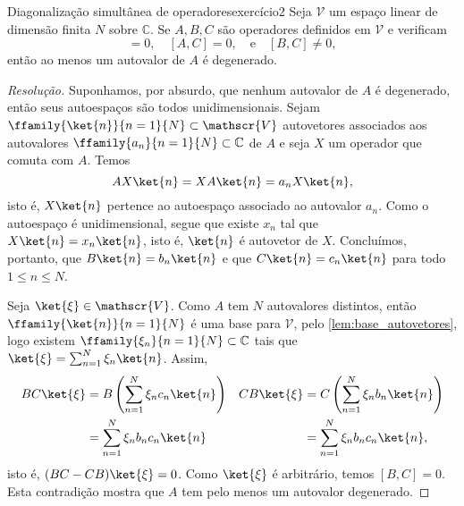 \begin{exercício}{Diagonalização simultânea de operadores}{exercício2}
    Seja \(\mathscr{V}\) um espaço linear de dimensão finita \(N\) sobre \(\mathbb{C}\). Se \(A, B, C\) são operadores definidos em \(\mathscr{V}\) e verificam
    \begin{equation*}
        [A,B] = 0,\quad
        [A,C] = 0,\quad\text{e}\quad
        [B,C] \neq 0,
    \end{equation*}
    então ao menos um autovalor de \(A\) é degenerado.
\end{exercício}
\begin{proof}[Resolução]
    Suponhamos, por absurdo, que nenhum autovalor de \(A\) é degenerado, então seus autoespaços são todos unidimensionais. Sejam \(\ffamily{\ket{n}}{n=1}{N}\subset \mathscr{V}\) autovetores associados aos autovalores \(\ffamily{a_n}{n=1}{N}\subset \mathbb{C}\) de \(A\) e seja \(X\) um operador que comuta com \(A\). Temos
    \begin{equation*}
        AX\ket{n} = XA\ket{n} = a_n X\ket{n},
    \end{equation*}
    isto é, \(X \ket{n}\) pertence ao autoespaço associado ao autovalor \(a_n\). Como o autoespaço é unidimensional, segue que existe \(x_n\) tal que \(X\ket{n} = x_n \ket{n}\), isto é, \(\ket{n}\) é autovetor de \(X\). Concluímos, portanto, que \(B \ket{n} = b_n \ket{n}\) e que \(C \ket{n} = c_n \ket{n}\) para todo \(1 \leq n \leq N\).

    Seja \(\ket{\xi} \in \mathscr{V}\). Como \(A\) tem \(N\) autovalores distintos, então \(\ffamily{\ket{n}}{n=1}{N}\) é uma base para \(\mathscr{V}\), pelo \cref{lem:base_autovetores}, logo existem \(\ffamily{\xi_n}{n=1}{N} \subset \mathbb{C}\) tais que \(\ket{\xi} = \sum_{n = 1}^N \xi_n \ket{n}\). Assim,
    \begin{align*}
        BC\ket{\xi} &= B \left(\sum_{n = 1}^N \xi_n c_n \ket{n}\right)&
        CB\ket{\xi} &= C \left(\sum_{n=1}^N \xi_n b_n \ket{n}\right)\\
                    &= \sum_{n=1}^N \xi_n b_n c_n \ket{n}&
                    &= \sum_{n=1}^N \xi_n b_n c_n \ket{n},
    \end{align*}
    isto é, \((BC - CB)\ket{\xi} = 0\). Como \(\ket{\xi}\) é arbitrário, temos \([B,C] = 0\). Esta contradição mostra que \(A\) tem pelo menos um autovalor degenerado.
\end{proof}
